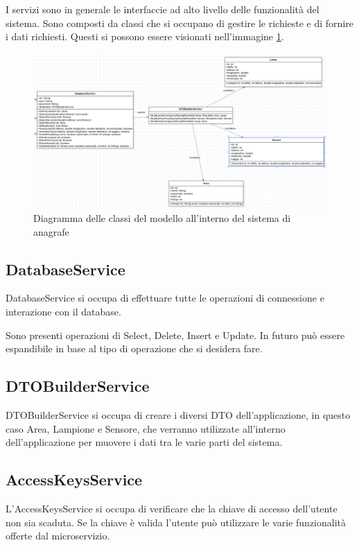 I servizi sono in generale le interfaccie ad alto livello delle funzionalità del sistema. Sono composti da classi che si occupano di gestire le richieste e di fornire i dati richiesti.
Questi si possono essere visionati nell'immagine \ref{fig:services_anagrafe}.

\begin{figure}[h]
    \centering
    \includegraphics[width=\textwidth]{img/services_anagrafe.png}
    \caption{Diagramma delle classi del modello all'interno del sistema di anagrafe}
    \label{fig:services_anagrafe}
\end{figure}

\subsection{DatabaseService}

DatabaseService si occupa di effettuare tutte le operazioni di connessione e interazione con il database. 

Sono presenti operazioni di Select, Delete, Insert e Update. In futuro può essere espandibile in base al tipo di operazione che si desidera fare.

\subsection{DTOBuilderService}
DTOBuilderService si occupa di creare i diversi DTO dell'applicazione, in questo caso Area, Lampione e Sensore, che verranno utilizzate all'interno dell'applicazione per muovere i dati tra le varie parti del sistema.

\subsection{AccessKeysService}
L'AccessKeysService si occupa di verificare che la chiave di accesso dell'utente non sia scaduta. Se la chiave è valida l'utente può utilizzare le varie funzionalità offerte dal microservizio.

